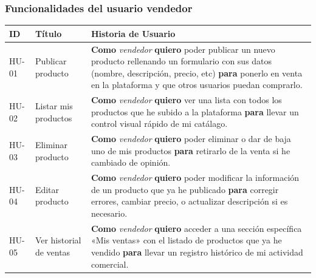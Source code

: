 \documentclass[11pt]{article}
\begin{document}
      \subsubsection{Funcionalidades del usuario vendedor}
          \begin{table}[H]
              \centering
              \begin{tabularx}{\textwidth}{|l|p{3.5cm}|X|}
                  \hline
                  \textbf{ID} & \textbf{Título}         & \textbf{Historia de Usuario}                                                                                                                                                                                                                      \\ \hline
                  HU-01       & Publicar producto       & \textbf{Como} \textit{vendedor} \textbf{quiero} poder publicar un nuevo producto rellenando un formulario con sus datos (nombre, descripción, precio, etc) \textbf{para} ponerlo en venta en la plataforma y que otros usuarios puedan comprarlo. \\ \hline
                  HU-02       & Listar mis productos    & \textbf{Como} \textit{vendedor} \textbf{quiero} ver una lista con todos los productos que he subido a la plataforma \textbf{para} llevar un control visual rápido de mi catálago.                                                                 \\ \hline
                  HU-03       & Eliminar producto       & \textbf{Como} \textit{vendedor} \textbf{quiero} poder eliminar o dar de baja uno de mis productos \textbf{para} retirarlo de la venta si he cambiado de opinión.                                                                                  \\ \hline
                  HU-04       & Editar producto         & \textbf{Como} \textit{vendedor} \textbf{quiero} poder modificar la información de un producto que ya he publicado \textbf{para} corregir errores, cambiar precio, o actualizar descripción si es necesario.                                       \\ \hline
                  HU-05       & Ver historial de ventas & \textbf{Como} \textit{vendedor} \textbf{quiero} acceder a una sección específica «Mis ventas» con el listado de productos que ya he vendido \textbf{para} llevar un registro histórico de mi actividad comercial.                                 \\ \hline
              \end{tabularx}
          \end{table}
\end{document}
